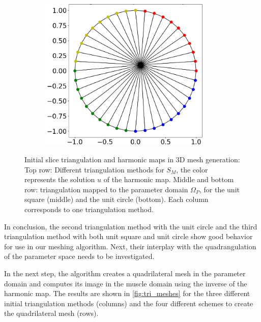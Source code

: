 \begin{figure}
\begin{subfigure}[t]{0.31\textwidth}
    \label{fig:w_10}%
  \end{subfigure}
  \quad
  \begin{subfigure}[t]{0.31\textwidth}%
    \centering%
    \includegraphics[width=0.9\textwidth, trim=37mm 14mm 6mm 6mm, clip, angle=225,origin=c]{images/fiber_creation/mesh_plots/out_2_0_0_tri.png}%
    \label{fig:w_20}%
  \end{subfigure}
  
  \caption{Initial slice triangulation and harmonic maps in 3D mesh generation: Top row: Different triangulation methods for $S_M$, the color represents the solution $u$ of the harmonic map. Middle and bottom row: triangulation mapped to the parameter domain $\Omega_P$, for the unit square (middle) and the unit circle (bottom). Each column corresponds to one triangulation method.}%
  \label{fig:tri_triangulations}%
\end{figure}%

In conclusion, the second triangulation method with the unit circle and the third triangulation method with both unit square and unit circle show good behavior for use in our meshing algorithm. Next, their interplay with the quadrangulation of the parameter space needs to be investigated.


In the next step, the algorithm creates a quadrilateral mesh in the parameter domain and computes its image in the muscle domain using the inverse of the harmonic map. The results are shown in \cref{fig:tri_meshes} for the three different initial triangulation methods (columns) and the four different schemes to create the quadrilateral mesh (rows).

